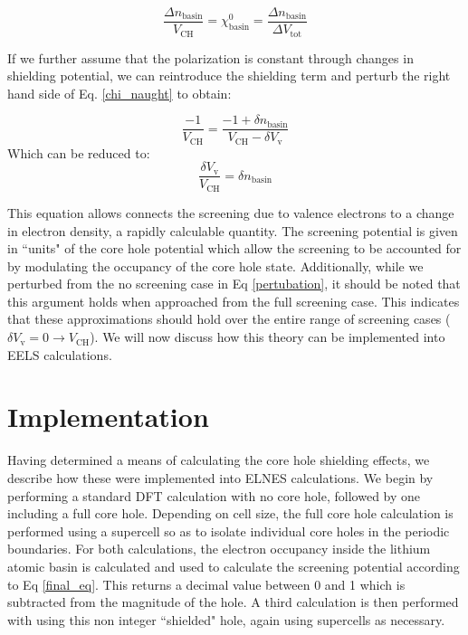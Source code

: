 \begin{equation}
\frac{\Delta n _{\mathrm{basin}}}{V_{\mathrm{CH}}} = \chi^0_{\mathrm{basin}} = \frac{\Delta n _{\mathrm{basin}}}{\Delta V_{\mathrm{tot}}}
\label{chi_naught}
\end{equation}

If we further assume that the polarization is constant through changes in shielding potential, we can reintroduce the shielding term and perturb the right hand side of Eq. \ref{chi_naught} to obtain: 


\begin{equation}
\frac{-1}{V_{\mathrm{CH}}} = \frac{-1+\delta n_{\mathrm{basin}}}{V_{\mathrm{CH}}-\delta V_{\mathrm{v}}}
\label{pertubation}
\end{equation}
Which can be reduced to:
\begin{equation}
\frac{\delta V_{\mathrm{v}}}{V_{\mathrm{CH}}} = \delta n_{\mathrm{basin}}
\label{final_eq}
\end{equation}

This equation allows connects the screening due to valence electrons to a change in electron density, a rapidly calculable quantity.  The screening potential is given in ``units" of the core hole potential which allow the screening to be accounted for by modulating the occupancy of the core hole state.  Additionally, while we perturbed from the no screening case in Eq \ref{pertubation}, it should be noted that this argument holds when approached from the full screening case.  This indicates that these approximations should hold over the entire range of screening cases ($\delta V_{\mathrm{v}} = 0 \to V_{\mathrm{CH}}$).  We will now discuss how this theory can be implemented into EELS calculations.  

\section{Implementation} \label{implementation}
Having determined a means of calculating the core hole shielding effects, we describe how these were implemented into ELNES calculations.  We begin by performing a standard DFT calculation with no core hole, followed by one including a full core hole. Depending on cell size, the full core hole calculation is performed using a supercell so as to isolate individual core holes in the periodic boundaries. For both calculations, the electron occupancy inside the lithium atomic basin is calculated and used to calculate the screening potential according to Eq \ref{final_eq}.  This returns a decimal value between 0 and 1 which is subtracted from the magnitude of the hole.  A third calculation is then performed with using this non integer ``shielded" hole, again using supercells as necessary.  




